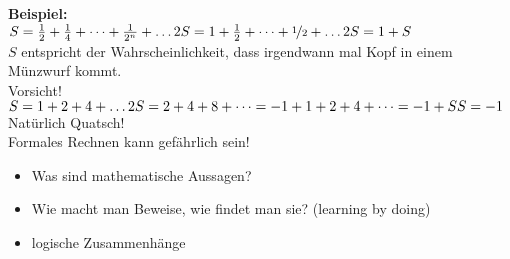 \documentclass[12pt,a4paper,titlepage]{article} %
\newcommand{\bsp}{\textbf{Beispiel:}\\}
\begin{document}
\bsp
$S = \frac{1}{2} + \frac{1}{4} + \dots + \frac{1}{2^n} + \dots\\
2S = 1 + \frac{1}{2} + \dots + \nicefrac{1}{2} + \dots\\
2S = 1 + S$\\
$S$ entspricht der Wahrscheinlichkeit, dass irgendwann mal Kopf in einem Münzwurf kommt.\\
Vorsicht!\\
$S = 1 + 2 + 4 + \dots\\
2S = 2 + 4 + 8 + \dots = -1 + 1 + 2 + 4 + \dots = -1 + S\\
S = -1$\\
Natürlich Quatsch!\\
Formales Rechnen kann gefährlich sein!

\begin{itemize}
  \item Was sind mathematische Aussagen?
  \item Wie macht man Beweise, wie findet man sie? (learning by doing)
  \item logische Zusammenhänge
\end{itemize}
\end{document}
